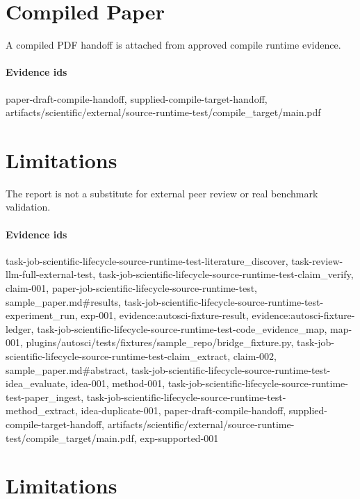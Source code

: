 \documentclass{article}
\begin{document}
\section{Compiled Paper}
A compiled PDF handoff is attached from approved compile runtime evidence.

\paragraph{Evidence ids} paper-draft-compile-handoff, supplied-compile-target-handoff, artifacts/scientific/external/source-runtime-test/compile\_target/main.pdf

\section{Limitations}
The report is not a substitute for external peer review or real benchmark validation.

\paragraph{Evidence ids} task-job-scientific-lifecycle-source-runtime-test-literature\_discover, task-review-llm-full-external-test, task-job-scientific-lifecycle-source-runtime-test-claim\_verify, claim-001, paper-job-scientific-lifecycle-source-runtime-test, sample\_paper.md\#results, task-job-scientific-lifecycle-source-runtime-test-experiment\_run, exp-001, evidence:autosci-fixture-result, evidence:autosci-fixture-ledger, task-job-scientific-lifecycle-source-runtime-test-code\_evidence\_map, map-001, plugins/autosci/tests/fixtures/sample\_repo/bridge\_fixture.py, task-job-scientific-lifecycle-source-runtime-test-claim\_extract, claim-002, sample\_paper.md\#abstract, task-job-scientific-lifecycle-source-runtime-test-idea\_evaluate, idea-001, method-001, task-job-scientific-lifecycle-source-runtime-test-paper\_ingest, task-job-scientific-lifecycle-source-runtime-test-method\_extract, idea-duplicate-001, paper-draft-compile-handoff, supplied-compile-target-handoff, artifacts/scientific/external/source-runtime-test/compile\_target/main.pdf, exp-supported-001

\section{Limitations}
\end{document}
